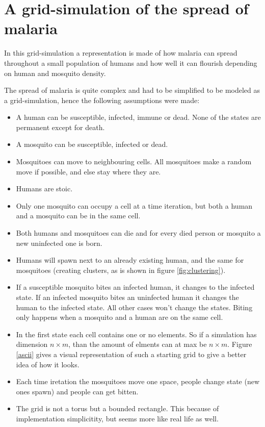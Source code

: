 \documentclass[a4paper]{report}
\begin{document}


\chapter{A grid-simulation of the spread of malaria}
\label{cha:malaria}

In this grid-simulation a representation is made of how malaria can spread
throughout a small population of humans and how well it can flourish
depending on human and mosquito density. 

The spread of malaria is quite complex and had to be simplified to be modeled as
a grid-simulation, hence the following assumptions were made:

\begin{itemize}
    \item A human can be susceptible, infected, immune or dead. None of the states are
        permanent except for death.
    \item A mosquito can be susceptible, infected or dead. 
    \item Mosquitoes can move to neighbouring cells. All mosquitoes make a
        random move if possible, and else stay where they are.
    \item Humans are stoic.
    \item Only one mosquito can occupy a cell at a time iteration, but both a
        human and a mosquito can be in the same cell.
    \item Both humans and mosquitoes can die and for every died person or
        mosquito a new uninfected one is born.
    \item Humans will spawn next to an already existing human, and the same for
        mosquitoes (creating clusters, as is shown in figure \ref{fig:clustering}).
    \item If a susceptible mosquito bites an infected human, it changes to the
        infected state. If an infected mosquito bites an uninfected human it
        changes the human to the infected state. All other cases won't change
        the states. Biting only happens when a mosquito and a human are on the
        same cell.
    \item In the first state each cell contains one or no elements. So
    if a simulation has dimension $n \times m$, than the amount of elments can
    at max be $n \times m$. Figure \ref{ascii} gives a visual representation of
    such a starting grid to give a better idea of how it looks.
    \item Each time iretation the mosquitoes move one space, people change state
        (new ones spawn)
        and people can get bitten.
    \item The grid is not a torus but a bounded rectangle. This because of
        implementation simplicitity, but seems more like real life as well.
\end{itemize}
\end{document}
